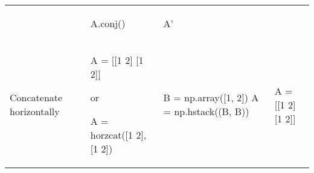 \documentclass[10pt, landscape]{article}
\newenvironment{Shaded}{}{}
\newcommand{\DecValTok}[1]{\textcolor[rgb]{0.25,0.63,0.44}{{#1}}}
\newcommand{\FloatTok}[1]{\textcolor[rgb]{0.25,0.63,0.44}{{#1}}}
\newcommand{\OperatorTok}[1]{\textcolor[rgb]{0.40,0.40,0.40}{{#1}}}
\newcommand{\NormalTok}[1]{{#1}}
\begin{document}
\begin{multicols}{2}
\begin{tabular}[ ]{@{}llll@{}}
\begin{minipage}[t]{0.23\columnwidth}
\begin{Shaded}
\end{Shaded}
\strut
\end{minipage} & \begin{minipage}[t]{0.20\columnwidth}\raggedright\strut
\begin{Shaded}
\begin{Highlighting}[]
\NormalTok{A.conj()}
\end{Highlighting}
\end{Shaded}
\strut
\end{minipage} & \begin{minipage}[t]{0.20\columnwidth}\raggedright\strut
\begin{Shaded}
\begin{Highlighting}[]
\NormalTok{A'}
\end{Highlighting}
\end{Shaded}
\strut
\end{minipage}\tabularnewline
\begin{minipage}[t]{0.24\columnwidth}\raggedright\strut
Concatenate horizontally\strut
\end{minipage} & \begin{minipage}[t]{0.23\columnwidth}\raggedright\strut
\begin{Shaded}
\begin{Highlighting}[]
\NormalTok{A = [[}\FloatTok{1} \FloatTok{2}\NormalTok{] [}\FloatTok{1} \FloatTok{2}\NormalTok{]]}
\end{Highlighting}
\end{Shaded}

or

\begin{Shaded}
\begin{Highlighting}[]
\NormalTok{A = horzcat([}\FloatTok{1} \FloatTok{2}\NormalTok{], [}\FloatTok{1} \FloatTok{2}\NormalTok{])}
\end{Highlighting}
\end{Shaded}
\strut
\end{minipage} & \begin{minipage}[t]{0.20\columnwidth}\raggedright\strut
\begin{Shaded}
\begin{Highlighting}[]
\NormalTok{B }\OperatorTok{=} \NormalTok{np.array([}\DecValTok{1}\NormalTok{, }\DecValTok{2}\NormalTok{])}
\NormalTok{A }\OperatorTok{=} \NormalTok{np.hstack((B, B))}
\end{Highlighting}
\end{Shaded}
\strut
\end{minipage} & \begin{minipage}[t]{0.20\columnwidth}\raggedright\strut
\begin{Shaded}
\begin{Highlighting}[]
\NormalTok{A = [[}\FloatTok{1} \FloatTok{2}\NormalTok{] [}\FloatTok{1} \FloatTok{2}\NormalTok{]]}
\end{Highlighting}
\end{Shaded}


\end{minipage}
\end{tabular}
\end{multicols}
\end{document}
